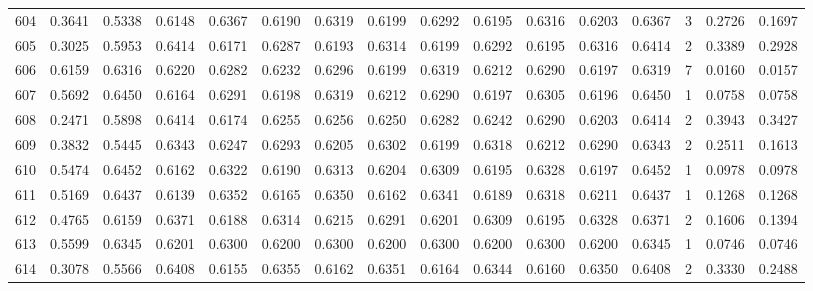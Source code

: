 \begin{tabular}{lrrrrrrrrrrrrrrr}
604 &      0.3641 &  0.5338 &  0.6148 &  0.6367 &  0.6190 &  0.6319 &  0.6199 &  0.6292 &  0.6195 &  0.6316 &   0.6203 &     0.6367 &      3 &                    0.2726 &                     0.1697 \\
605 &      0.3025 &  0.5953 &  0.6414 &  0.6171 &  0.6287 &  0.6193 &  0.6314 &  0.6199 &  0.6292 &  0.6195 &   0.6316 &     0.6414 &      2 &                    0.3389 &                     0.2928 \\
606 &      0.6159 &  0.6316 &  0.6220 &  0.6282 &  0.6232 &  0.6296 &  0.6199 &  0.6319 &  0.6212 &  0.6290 &   0.6197 &     0.6319 &      7 &                    0.0160 &                     0.0157 \\
607 &      0.5692 &  0.6450 &  0.6164 &  0.6291 &  0.6198 &  0.6319 &  0.6212 &  0.6290 &  0.6197 &  0.6305 &   0.6196 &     0.6450 &      1 &                    0.0758 &                     0.0758 \\
608 &      0.2471 &  0.5898 &  0.6414 &  0.6174 &  0.6255 &  0.6256 &  0.6250 &  0.6282 &  0.6242 &  0.6290 &   0.6203 &     0.6414 &      2 &                    0.3943 &                     0.3427 \\
609 &      0.3832 &  0.5445 &  0.6343 &  0.6247 &  0.6293 &  0.6205 &  0.6302 &  0.6199 &  0.6318 &  0.6212 &   0.6290 &     0.6343 &      2 &                    0.2511 &                     0.1613 \\
610 &      0.5474 &  0.6452 &  0.6162 &  0.6322 &  0.6190 &  0.6313 &  0.6204 &  0.6309 &  0.6195 &  0.6328 &   0.6197 &     0.6452 &      1 &                    0.0978 &                     0.0978 \\
611 &      0.5169 &  0.6437 &  0.6139 &  0.6352 &  0.6165 &  0.6350 &  0.6162 &  0.6341 &  0.6189 &  0.6318 &   0.6211 &     0.6437 &      1 &                    0.1268 &                     0.1268 \\
612 &      0.4765 &  0.6159 &  0.6371 &  0.6188 &  0.6314 &  0.6215 &  0.6291 &  0.6201 &  0.6309 &  0.6195 &   0.6328 &     0.6371 &      2 &                    0.1606 &                     0.1394 \\
613 &      0.5599 &  0.6345 &  0.6201 &  0.6300 &  0.6200 &  0.6300 &  0.6200 &  0.6300 &  0.6200 &  0.6300 &   0.6200 &     0.6345 &      1 &                    0.0746 &                     0.0746 \\
614 &      0.3078 &  0.5566 &  0.6408 &  0.6155 &  0.6355 &  0.6162 &  0.6351 &  0.6164 &  0.6344 &  0.6160 &   0.6350 &     0.6408 &      2 &                    0.3330 &                     0.2488 \\

\end{tabular}
